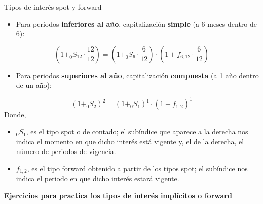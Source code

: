 \documentclass[
  letterpaper,
  DIV=11,
  numbers=noendperiod]{scrartcl}
\providecommand{\tightlist}{%
  \setlength{\itemsep}{0pt}\setlength{\parskip}{0pt}}\usepackage{longtable,booktabs,array}
\begin{document}
\begin{tcolorbox}[enhanced jigsaw, colframe=quarto-callout-note-color-frame, opacityback=0, colback=white, leftrule=.75mm, left=2mm, breakable, arc=.35mm, rightrule=.15mm, toprule=.15mm, bottomrule=.15mm]
\begin{minipage}[t]{5.5mm}
\textcolor{quarto-callout-note-color}{\faInfo}
\end{minipage}%
\begin{minipage}[t]{\textwidth - 5.5mm}

Tipos de interés spot y forward

\begin{itemize}
\tightlist
\item
  Para periodos \textbf{inferiores al año}, capitalización
  \textbf{simple} (a 6 meses dentro de 6):
\end{itemize}

\[(1+_{0}S_{12} \cdot \frac{12 }{12 })=(1+_{0}S_{6} \cdot \frac{6 }{12 })\cdot(1+f_{6,12}\cdot \frac{6 }{12 })\]

\begin{itemize}
\tightlist
\item
  Para periodos \textbf{superiores al año}, capitalización
  \textbf{compuesta} (a 1 año dentro de un año):
\end{itemize}

\[(1+_{0}S_{2})^{2}=(1+_{0}S_{1})^1\cdot(1+f_{1,2})^1\] Donde,

\begin{itemize}
\item
  \(_{0}S_{1}\), es el tipo spot o de contado; el subíndice que aparece
  a la derecha nos indica el momento en que dicho interés está vigente
  y, el de la derecha, el número de periodos de vigencia.
\item
  \(f_{1,2}\), es el tipo forward obtenido a partir de los tipos spot;
  el subíndice nos indica el periodo en que dicho interés estará
  vigente.
\end{itemize}

\href{https://monografia-tipos-spot-forward.netlify.app/}{\textbf{Ejercicios
para practica los tipos de interés implícitos o forward}}

\end{minipage}%
\end{tcolorbox}
\end{document}
